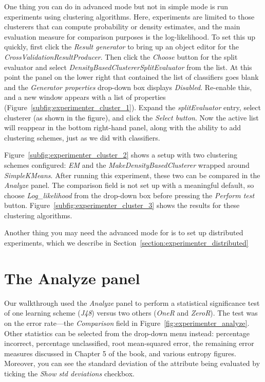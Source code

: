 One thing you can do in advanced mode but not in simple mode is run
experiments using clustering algorithms. Here, experiments are limited
to those clusterers that can compute probability or density estimates,
and the main evaluation measure for comparison purposes is the
log-likelihood. To set this up quickly, first click the \textit{Result
generator} to bring up an object editor for the
\textit{CrossValidationResultProducer}. Then click the \textit{Choose}
button for the split evaluator and select
\textit{DensityBasedClustererSplitEvaluator} from the list. At this
point the panel on the lower right that contained the list of
classifiers goes blank and the \textit{Generator properties} drop-down
box displays \textit{Disabled}. Re-enable this, and a new window
appears with a list of properties
(Figure~\ref{subfig:experimenter_cluster_1}). Expand the
{\em splitEvaluator} entry, select clusterer (as shown in the figure), and
click the {\em Select button}. Now the active list will reappear in the
bottom right-hand panel, along with the ability to add clustering
schemes, just as we did with classifiers.

Figure~\ref{subfig:experimenter_cluster_2} shows a setup with two
clustering schemes configured: \textit{EM} and the
\textit{MakeDensityBasedClusterer} wrapped around
\textit{SimpleKMeans}. After running this experiment, these two can be
compared in the \textit{Analyze} panel. The comparison field is not
set up with a meaningful default, so choose {\em Log\_likelihood} from the
drop-down box before pressing the \textit{Perform test}
button. Figure~\ref{subfig:experimenter_cluster_3} shows the results
for these clustering algorithms.

Another thing you may need the advanced mode for is to set up
distributed experiments, which we describe in
Section~\ref{section:experimenter_distributed}

\section{The Analyze panel}

Our walkthrough used the \textit{Analyze} panel to perform a
statistical significance test of one learning scheme (\textit{J48})
versus two others (\textit{OneR} and \textit{ZeroR}). The test was on
the error rate---the \textit{Comparison} field in
Figure~\ref{fig:experimenter_analyze}. Other statistics can be
selected from the drop-down menu instead: percentage incorrect,
percentage unclassified, root mean-squared error, the remaining error
measures discussed in Chapter 5 of the book, and various entropy
figures. Moreover, you can see the standard deviation of the attribute
being evaluated by ticking the \textit{Show std deviations} checkbox.

